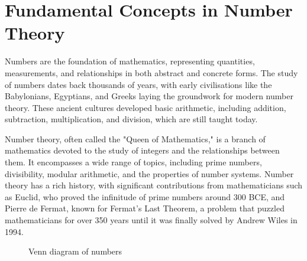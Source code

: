 \chapter{Fundamental Concepts in Number Theory}
\label{chap:ch2}
Numbers are the foundation of mathematics, representing quantities, measurements, and relationships in both abstract and concrete forms. The study of numbers dates back thousands of years, with early civilisations like the Babylonians, Egyptians, and Greeks laying the groundwork for modern number theory. These ancient cultures developed basic arithmetic, including addition, subtraction, multiplication, and division, which are still taught today.

Number theory, often called the "Queen of Mathematics," is a branch of mathematics devoted to the study of integers and the relationships between them. It encompasses a wide range of topics, including prime numbers, divisibility, modular arithmetic, and the properties of number systems. Number theory has a rich history, with significant contributions from mathematicians such as Euclid, who proved the infinitude of prime numbers around 300 BCE, and Pierre de Fermat, known for Fermat's Last Theorem, a problem that puzzled mathematicians for over 350 years until it was finally solved by Andrew Wiles in 1994.

\begin{figure}[h!]
    \centering
{}
    \caption{Venn diagram of numbers}
    \label{fig:venn_num}
\end{figure}

